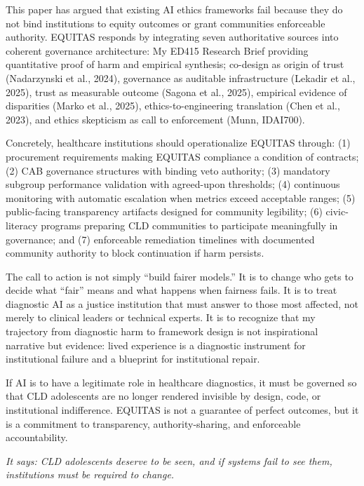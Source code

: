 \documentclass[12pt,a4paper]{article}
\begin{document}
This paper has argued that existing AI ethics frameworks fail because they do not bind institutions to equity outcomes or grant communities enforceable authority. EQUITAS responds by integrating seven authoritative sources into coherent governance architecture: My ED415 Research Brief providing quantitative proof of harm and empirical synthesis; co-design as origin of trust (Nadarzynski et al., 2024), governance as auditable infrastructure (Lekadir et al., 2025), trust as measurable outcome (Sagona et al., 2025), empirical evidence of disparities (Marko et al., 2025), ethics-to-engineering translation (Chen et al., 2023), and ethics skepticism as call to enforcement (Munn, IDAI700).\cite{garcia_ed415}\cite{nadarzynski2024}\cite{lekadir2025}\cite{sagona2025}\cite{marko2025}\cite{chen2023}\cite{munn_idai700}

Concretely, healthcare institutions should operationalize EQUITAS through: (1) procurement requirements making EQUITAS compliance a condition of contracts; (2) CAB governance structures with binding veto authority; (3) mandatory subgroup performance validation with agreed-upon thresholds; (4) continuous monitoring with automatic escalation when metrics exceed acceptable ranges; (5) public-facing transparency artifacts designed for community legibility; (6) civic-literacy programs preparing CLD communities to participate meaningfully in governance; and (7) enforceable remediation timelines with documented community authority to block continuation if harm persists.\cite{garcia_ed415}

The call to action is not simply ``build fairer models.'' It is to change who gets to decide what ``fair'' means and what happens when fairness fails. It is to treat diagnostic AI as a justice institution that must answer to those most affected, not merely to clinical leaders or technical experts. It is to recognize that my trajectory from diagnostic harm to framework design is not inspirational narrative but evidence: lived experience is a diagnostic instrument for institutional failure and a blueprint for institutional repair.\cite{garcia_ed415}

If AI is to have a legitimate role in healthcare diagnostics, it must be governed so that CLD adolescents are no longer rendered invisible by design, code, or institutional indifference. EQUITAS is not a guarantee of perfect outcomes, but it is a commitment to transparency, authority-sharing, and enforceable accountability. 

\textit{It says: CLD adolescents deserve to be seen, and if systems fail to see them, institutions must be required to change.}\cite{garcia_ed415}
\end{document}
